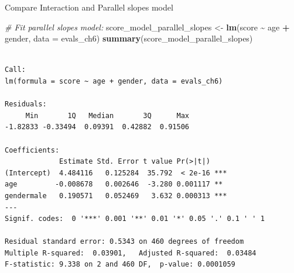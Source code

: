 \documentclass[
  ignorenonframetext,
]{beamer}
\newenvironment{Shaded}{\begin{snugshade}}{\end{snugshade}}
\newcommand{\AttributeTok}[1]{\textcolor[rgb]{0.13,0.29,0.53}{#1}}
\newcommand{\CommentTok}[1]{\textcolor[rgb]{0.56,0.35,0.01}{\textit{#1}}}
\newcommand{\FunctionTok}[1]{\textcolor[rgb]{0.13,0.29,0.53}{\textbf{#1}}}
\newcommand{\NormalTok}[1]{#1}
\newcommand{\OtherTok}[1]{\textcolor[rgb]{0.56,0.35,0.01}{#1}}
\newcommand{\SpecialCharTok}[1]{\textcolor[rgb]{0.81,0.36,0.00}{\textbf{#1}}}
\begin{document}
\begin{frame}[fragile]{Compare Interaction and Parallel slopes model}
\label{compare-interaction-and-parallel-slopes-model-1}
\scriptsize

\begin{Shaded}
\begin{Highlighting}[]
\CommentTok{\# Fit parallel slopes model:}
\NormalTok{score\_model\_parallel\_slopes }\OtherTok{\textless{}{-}} \FunctionTok{lm}\NormalTok{(score }\SpecialCharTok{\textasciitilde{}}\NormalTok{ age }\SpecialCharTok{+}\NormalTok{ gender, }\AttributeTok{data =}\NormalTok{ evals\_ch6)}
\FunctionTok{summary}\NormalTok{(score\_model\_parallel\_slopes)}
\end{Highlighting}
\end{Shaded}

\begin{verbatim}

Call:
lm(formula = score ~ age + gender, data = evals_ch6)

Residuals:
     Min       1Q   Median       3Q      Max 
-1.82833 -0.33494  0.09391  0.42882  0.91506 

Coefficients:
             Estimate Std. Error t value Pr(>|t|)    
(Intercept)  4.484116   0.125284  35.792  < 2e-16 ***
age         -0.008678   0.002646  -3.280 0.001117 ** 
gendermale   0.190571   0.052469   3.632 0.000313 ***
---
Signif. codes:  0 '***' 0.001 '**' 0.01 '*' 0.05 '.' 0.1 ' ' 1

Residual standard error: 0.5343 on 460 degrees of freedom
Multiple R-squared:  0.03901,   Adjusted R-squared:  0.03484 
F-statistic: 9.338 on 2 and 460 DF,  p-value: 0.0001059
\end{verbatim}

\normalsize
\end{frame}
\end{document}
